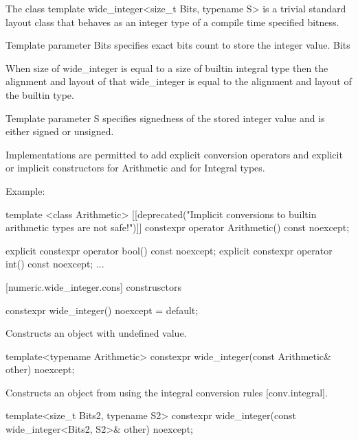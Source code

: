 \begin{addedblock}
The class template wide_integer<size_t Bits, typename S> is a trivial standard layout class that behaves as an integer type of a compile time specified bitness.

Template parameter Bits specifies exact bits count to store the integer value. Bits %

When size of wide_integer is equal to a size of builtin integral type then the alignment and layout of that wide_integer is equal to the alignment and layout of the builtin type.

Template parameter S specifies signedness of the stored integer value and is either signed or unsigned.

Implementations are permitted to add explicit conversion operators and explicit or implicit constructors for Arithmetic and for Integral types.

Example:

\begin{codeblock}
template <class Arithmetic>
[[deprecated("Implicit conversions to builtin arithmetic types are not safe!")]]
  constexpr operator Arithmetic() const noexcept;

explicit constexpr operator bool() const noexcept;
explicit constexpr operator int() const noexcept;
...
\end{codeblock}


[numeric.wide_integer.cons]{ construsctors}

\begin{itemdecl}
constexpr wide_integer() noexcept = default;
\end{itemdecl}

\begin{itemdescr}
\effects Constructs an object with undefined value.
\end{itemdescr}

\begin{itemdecl}
template<typename Arithmetic>
  constexpr wide_integer(const Arithmetic& other) noexcept;
\end{itemdecl}

\begin{itemdescr}
\effects Constructs an object from  using the integral conversion rules [conv.integral].
\end{itemdescr}

\begin{itemdecl}
template<size_t Bits2, typename S2> 
  constexpr wide_integer(const wide_integer<Bits2, S2>& other) noexcept;
\end{itemdecl}


\end{addedblock}
